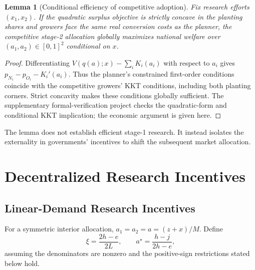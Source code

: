 \documentclass[USenglish]{article}
\newtheorem{lemma}{Lemma}
\begin{document}
\begin{lemma}[Conditional efficiency of competitive adoption]
Fix research efforts $(x_1,x_2)$. If the quadratic surplus objective is strictly concave in the planting shares and growers face the same real conversion costs as the planner, the competitive stage-2 allocation globally maximizes national welfare over $(a_1,a_2)\in[0,1]^2$ conditional on $x$.
\end{lemma}
\begin{proof}
Differentiating $V(q(a);x)-\sum_iK_i(a_i)$ with respect to $a_i$ gives $p_{N_i}-p_{O_i}-K_i'(a_i)$. Thus the planner's constrained first-order conditions coincide with the competitive growers' KKT conditions, including both planting corners. Strict concavity makes these conditions globally sufficient. The supplementary formal-verification project checks the quadratic-form and conditional KKT implication; the economic argument is given here.
\end{proof}
The lemma does not establish efficient stage-1 research. It instead isolates the externality in governments' incentives to shift the subsequent market allocation.

\section{Decentralized Research Incentives}
\subsection{Linear-Demand Research Incentives}
For a symmetric interior allocation, $a_1=a_2=a=(z+x)/M$. Define
\begin{equation}
 \xi=\frac{2h-e}{2L},\qquad a^\star=\frac{h-j}{2h-e},
 \label{eq:threshold}
\end{equation}
assuming the denominators are nonzero and the positive-sign restrictions stated below hold.
\end{document}
